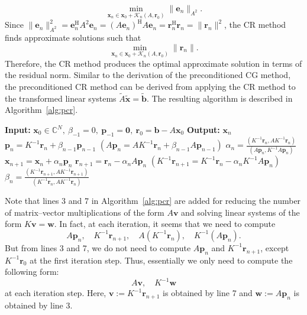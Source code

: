 \[\min_{\bm x_n\in\bm x_0+\mathcal K_n(A,\bm r_0)}\|\bm e_n\|_{A^2}.\]
{Since $\|\bm e_n\|_{A^2}^2=\bm e_n^{\mathrm H}A^2\bm e_n=(A\bm e_n)^{\mathrm H}A\bm e_n=\bm r_n^{\mathrm H}\bm r_n=\|\bm r_n\|^2$, the CR method finds approximate solutions such that}
\[\min_{\bm x_n\in\bm x_0+\mathcal K_n(A,\bm r_0)}\|\bm r_n\|.\]
{Therefore, the CR method produces the optimal approximate solution in terms of the residual norm. Similar to the derivation of the preconditioned CG method, the preconditioned CR method can be derived from applying the CR method to the transformed linear systems $\widetilde A\widetilde{\bm x}=\widetilde{\bm b}$. The resulting algorithm is described in Algorithm\ \ref{alg:pcr}.}
\begin{algorithm}[H]\caption{{The preconditioned CR method}}\label{alg:pcr}\begin{algorithmic}[1]
\Statex\textbf{Input:} $\bm x_0\in\mathbb C^N,\ \beta_{-1}=0,\ \bm p_{-1}=\bm0,\ \bm r_0=\bm b-A\bm x_0$
\Statex\textbf{Output:} $\bm x_n$
\State $\bm p_n=K^{-1}\bm r_n+\beta_{n-1}\bm p_{n-1}$
\State $(A\bm p_n=AK^{-1}\bm r_n+\beta_{n-1}A\bm p_{n-1})$
\State $\alpha_n=\frac{(K^{-1}\bm r_n,AK^{-1}\bm r_n)}{(A\bm p_n,K^{-1}A\bm p_n)}$
\State $\bm x_{n+1}=\bm x_n+\alpha_n\bm p_n$
\State $\bm r_{n+1}=\bm r_n-\alpha_nA\bm p_n$
\State $(K^{-1}\bm r_{n+1}=K^{-1}\bm r_n-\alpha_nK^{-1}A\bm p_n)$
\State $\beta_n=\frac{(K^{-1}\bm r_{n+1},AK^{-1}\bm r_{n+1})}{(K^{-1}\bm r_n,AK^{-1}\bm r_n)}$
\EndFor\end{algorithmic}\end{algorithm}
{Note that lines 3 and 7 in Algorithm\ \ref{alg:pcr} are added for reducing the number of matrix--vector multiplications of the form $A\bm v$ and solving linear systems of the form $K\bm v=\bm w$. In fact, at each iteration, it seems that we need to compute}
\[A\bm p_n,\quad K^{-1}\bm r_{n+1},\quad A(K^{-1}\bm r_n),\quad K^{-1}(A\bm p_n).\]
{But from lines 3 and 7, we do not need to compute $A\bm p_n$ and $K^{-1}\bm r_{n+1}$, except $K^{-1}\bm r_0$ at the first iteration step. Thus, essentially we only need to compute the following form:}
\[A\bm v,\quad K^{-1}\bm w\]
{at each iteration step. Here, $\bm v:=K^{-1}\bm r_{n+1}$ is obtained by line 7 and $\bm w:=A\bm p_n$ is obtained by line 3.}
